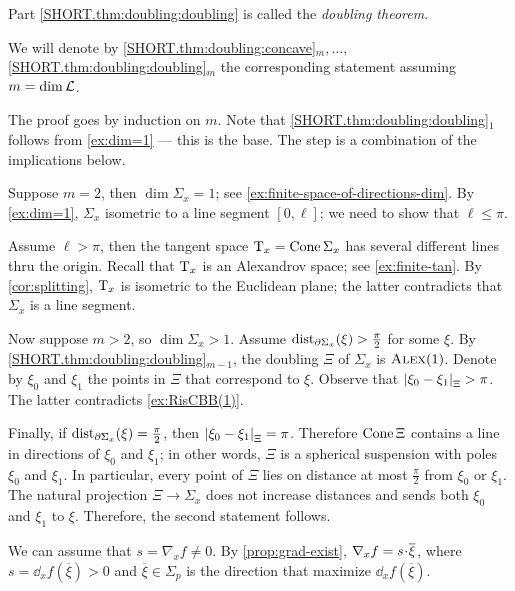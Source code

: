 Part \ref{SHORT.thm:doubling:doubling} is called the \emph{doubling theorem}.

We will denote by 
\ref{SHORT.thm:doubling:concave}$_m,\dots,$\ref{SHORT.thm:doubling:doubling}$_m$ the corresponding statement assuming $m=\operatorname{\rm dim}\nolimits\mathcal{L}$.

The proof goes by induction on $m$.
Note that \ref{SHORT.thm:doubling:doubling}$_1$ follows from \ref{ex:dim=1} --- this is the base.
The step is a combination of the implications below.

Suppose $m=2$, then $\dim\Sigma_x=1$; see \ref{ex:finite-space-of-directions-dim}.
By \ref{ex:dim=1}, $\Sigma_x$ isometric to a line segment $[0,\ell]$;
we need to show that $\ell\le\pi$.

Assume $\ell>\pi$, then the tangent space $\mathrm{T}_x=\mathop{\rm Cone}\nolimits\Sigma_x$ has several different lines thru the origin.
Recall that $\mathrm{T}_x$ is an Alexandrov space; see \ref{ex:finite-tan}.
By \ref{cor:splitting}, $\mathrm{T}_x$ is isometric to the Euclidean plane;
the latter contradicts that $\Sigma_x$ is a line segment.

Now suppose $m>2$, so $\dim \Sigma_x>1$.
Assume $\mathrm{dist}_{\partial \Sigma_x}(\xi)> \tfrac\pi2$ for some $\xi$.
By \ref{SHORT.thm:doubling:doubling}$_{m-1}$, the doubling $\Xi$ of $\Sigma_x$ is $\textsc{Alex}(1)$.
Denote by $\xi_0$ and $\xi_1$ the points in $\Xi$ that correspond to $\xi$.
Observe that $|{\xi_0}-{\xi_1}|_{\Xi}^{{}}>\pi$.
The latter contradicts \ref{ex:RisCBB(1)}.

Finally, if $\mathrm{dist}_{\partial \Sigma_x}(\xi)= \tfrac\pi2$, then $|{\xi_0}-{\xi_1}|_{\Xi}^{{}}=\pi$.
Therefore $\mathop{\rm Cone}\nolimits \Xi$ contains a line in directions of $\xi_0$ and $\xi_1$;
in other words, $\Xi$ is a spherical suspension with poles $\xi_0$ and $\xi_1$.
In particular, every point of $\Xi$ lies on distance at most $\tfrac\pi2$ from $\xi_0$ or $\xi_1$.
The natural projection $\Xi\to \Sigma_x$ does not increase distances and sends both  $\xi_0$ and $\xi_1$ to $\xi$.
Therefore, the second statement follows.

We can assume that $s=\nabla_xf\ne 0$.
By \ref{prop:grad-exist}, $\nabla_xf\z=s\cdot \overline{\xi}$, where $s=\dd_xf(\overline{\xi})>0$ and $\overline{\xi}\in\Sigma_p$ is the direction that maximize $\dd_xf(\overline{\xi})$.

